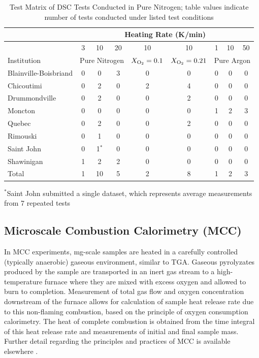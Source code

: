 \documentclass{book}
\begin{document}
\begin{table}
\caption{Test Matrix of DSC Tests Conducted in Pure Nitrogen; table values indicate number of tests conducted under listed test conditions}
\label{Table_5}
\begin{center}
\begin{tabular}{lcccccccc}
                      & \multicolumn{8}{c}{Heating Rate (K/min)} \\ \hline
                      & 3 & 10 & 20 & 10 & 10 & 1  & 10 & 50 \\ \hline
Institution           & \multicolumn{3}{c}{Pure Nitrogen} & $X_{\rm O_2}=0.1$ & $X_{\rm O_2}=0.21$ & \multicolumn{3}{c}{Pure Argon}  \\ \hline
Blainville-Boisbriand & 0 & 0     &     3 & 0 & 0 & 0 & 0 & 0 \\
Chicoutimi            & 0 & 2     &     0 & 2 & 4 & 0 & 0 & 0 \\
Drummondville         & 0 & 2     &     0 & 0 & 2 & 0 & 0 & 0 \\
Moncton               & 0 & 0     &     0 & 0 & 0 & 1 & 2 & 3 \\
Quebec                & 0 & 2     &     0 & 0 & 2 & 0 & 0 & 0 \\
Rimouski              & 0 & 1     &     0 & 0 & 0 & 0 & 0 & 0 \\
Saint John            & 0 & 1$^*$ &     0 & 0 & 0 & 0 & 0 & 0 \\
Shawinigan            & 1 & 2     &     2 & 0 & 0 & 0 & 0 & 0 \\ \hline
Total                 & 1 & 10    &     5 & 2 & 8 & 1 & 2 & 3 \\ \hline
\end{tabular}
\end{center}
$^*$Saint John submitted a single dataset, which represents average measurements from 7 repeated tests
\end{table}

\subsection{Microscale Combustion Calorimetry (MCC)}

In MCC experiments, mg-scale samples are heated in a carefully controlled (typically anaerobic) gaseous environment, similar to TGA. Gaseous pyrolyzates produced by the sample are transported in an inert gas stream to a high-temperature furnace where they are mixed with excess oxygen and allowed to burn to completion. Measurement of total gas flow and oxygen concentration downstream of the furnace allows for calculation of sample heat release rate due to this non-flaming combustion, based on the principle of oxygen consumption calorimetry. The heat of complete combustion is obtained from the time integral of this heat release rate and measurements of initial and final sample mass. Further detail regarding the principles and practices of MCC is available elsewhere \cite{lyon2013principles}.
\end{document}
